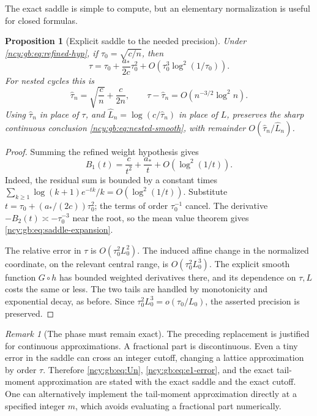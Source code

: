 \documentclass[11pt,letterpaper]{article}
\numberwithin{equation}{section}
\newtheorem{proposition}[theorem]{Proposition}
\theoremstyle{remark}\newtheorem{remark}[theorem]{Remark}
\theoremstyle{definition}\newtheorem{definition}[theorem]{Definition}\theoremstyle{plain}
\begin{document}
The exact saddle is simple to compute, but an elementary
normalization is useful for closed formulas.

\begin{proposition}[Explicit saddle to the needed precision]
\label{ncy:gb:prop:explicit-saddle}
Under \eqref{ncy:gb:eq:refined-hyp}, if \(\tau_0=\sqrt{c/n}\), then
\begin{equation}\label{ncy:gb:eq:saddle-expansion}
 \tau=\tau_0+\frac{a_*}{2c}\tau_0^2
       +O(\tau_0^3\log^2(1/\tau_0)).
\end{equation}
For nested cycles this is
\begin{equation}\label{ncy:gb:eq:explicit-cycle-saddle}
 \widehat\tau_n=\sqrt{\frac cn}+\frac{c}{2n},
 \qquad
 \tau-\widehat\tau_n=O(n^{-3/2}\log^2n).
\end{equation}
Using \(\widehat\tau_n\) in place of \(\tau\), and
\(\widehat L_n=\log(c/\widehat\tau_n)\) in place of \(L\),
preserves the sharp continuous conclusion
\eqref{ncy:gb:eq:nested-smooth}, with remainder \(O(\widehat\tau_n/\widehat L_n)\).
\end{proposition}

\begin{proof}
Summing the refined weight hypothesis gives
\[
 B_1(t)=\frac{c}{t^2}+\frac{a_*}{t}
        +O(\log^2(1/t)).
\]
Indeed, the residual sum is bounded by a constant times
\(\sum_{k\ge1}\log(k+1)e^{-tk}/k=O(\log^2(1/t))\).
Substitute \(t=\tau_0+(a_*/(2c))\tau_0^2\);
the terms of order \(\tau_0^{-1}\) cancel.
The derivative \(-B_2(t)\asymp-\tau_0^{-3}\) near the root,
so the mean value theorem gives \eqref{ncy:gb:eq:saddle-expansion}.

The relative error in \(\tau\) is \(O(\tau_0^2L_0^2)\).
The induced affine change in the normalized coordinate, on the
relevant central range, is \(O(\tau_0^2L_0^3)\).
The explicit smooth function \(G\circ h\) has bounded weighted
derivatives there, and its dependence on \(\tau,L\) costs the
same or less. The two tails are handled by monotonicity and
exponential decay, as before. Since
\(\tau_0^2L_0^3=o(\tau_0/L_0)\), the asserted precision is
preserved.
\end{proof}

\begin{remark}[The phase must remain exact]\label{ncy:gb:rem:phase}
The preceding replacement is justified for continuous
approximations. A fractional part is discontinuous. Even a tiny
error in the saddle can cross an integer cutoff, changing a
lattice approximation by order \(\tau\).
Therefore \eqref{ncy:gb:eq:Un}, \eqref{ncy:gb:eq:e1-error}, and the exact
tail-moment approximation are stated with the exact saddle and
the exact cutoff. One can alternatively implement the
tail-moment approximation directly at a specified integer \(m\),
which avoids evaluating a fractional part numerically.
\end{remark}
\end{document}

